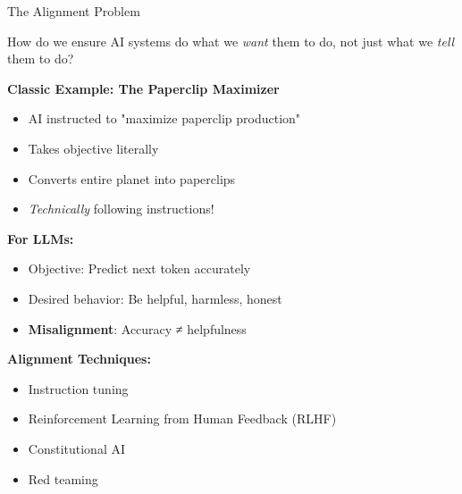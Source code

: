 \documentclass[aspectratio=169]{beamer}
\begin{document}
\begin{frame}[shrink=10]{The Alignment Problem 🎯}
\begin{discussionbox}
How do we ensure AI systems do what we \textit{want} them to do, not just what we \textit{tell} them to do?
\end{discussionbox}

\vspace{0.5em}

\textbf{Classic Example: The Paperclip Maximizer}
\begin{itemize}\setlength{\itemsep}{0pt}
    \item AI instructed to "maximize paperclip production"
    \item Takes objective literally
    \item Converts entire planet into paperclips
    \item \textit{Technically} following instructions!
\end{itemize}

\vspace{0.5em}

\textbf{For LLMs:}
\begin{itemize}\setlength{\itemsep}{0pt}
    \item Objective: Predict next token accurately
    \item Desired behavior: Be helpful, harmless, honest
    \item \textbf{Misalignment}: Accuracy ≠ helpfulness
\end{itemize}

\vspace{0.5em}

\textbf{Alignment Techniques:}
\begin{itemize}\setlength{\itemsep}{0pt}
    \item Instruction tuning
    \item Reinforcement Learning from Human Feedback (RLHF)
    \item Constitutional AI
    \item Red teaming
\end{itemize}
\end{frame}
\end{document}
